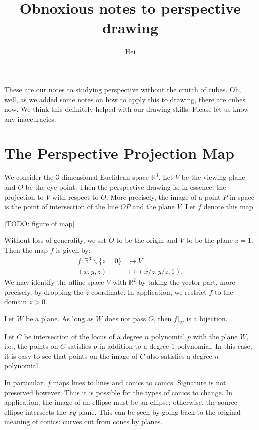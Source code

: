 \documentclass{amsart}
\title {Obnoxious notes to perspective drawing}
\author {Hei}
\newcommand{\RR}{\mathbb {R}}
\begin{document}
\maketitle
These are our notes to studying perspective without the crutch of cubes. Oh, well, as we added some notes on how to apply this to drawing, there are cubes now.  We think this definitely helped with our
drawing skills.  Please let us know any inaccuracies.

\section{The Perspective Projection Map}
\label{sec:persp-proj-map}

We consider the $3$-dimensional Euclidean space $\RR^3$. Let $V$ be the viewing plane and $O$ be the eye point. Then the perspective drawing is, in essence,
the projection to $V$ with respect to $O$. More precisely, the image of a point $P$ in space is the point of
intersection of the line $OP$ and the plane $V$. Let $f$ denote this map.

[TODO: figure of map]

Without loss of generality, we set $O$ to be the origin and $V$ to be the plane $z=1$. Then the map $f$ is given by:
\begin{align*}
  f: \RR^3\backslash \{z=0\} &\rightarrow V \\
  (x,y,z) &\mapsto (x/z,y/z,1).
\end{align*}
We may identify the affine space $V$ with $\RR^2$ by taking the vector part, more precisely, by dropping the $z$-coordinate. In application, we restrict $f$ to the domain  $z>0$.

Let $W$ be a plane. As long as $W$ does not pass $O$, then $f|_W$ is a bijection.

Let $C$ be intersection of the locus of a degree $n$ polynomial $p$ with the plane $W$, i.e., the points on $C$ satisfies $p$ in addition to a degree $1$ polynomial. In this case, it is easy to see that points on the image of $C$ also satisfies a degree $n$ polynomial.

In particular, $f$  maps lines to lines and conics to conics. Signature is not preserved however. Thus it is possible for the types of conics to change. In application, the image of an ellipse must be an ellipse; otherwise, the source ellipse intersects the $xy$-plane. This can be seen by going back to the original meaning of conics: curves cut from cones by planes.
\end{document}
